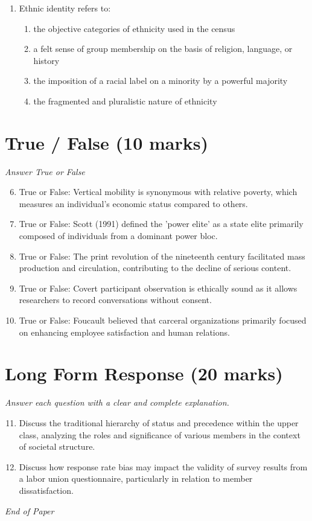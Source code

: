 \documentclass[12pt]{article}
\begin{document}
\begin{enumerate}[label=\arabic*.]
\begin{enumerate}[label=(\alph*)]
    \item creating 'reverse flows' of their own programmes back to imperial societies
    \item all of the above
\end{enumerate}
\item Ethnic identity refers to:
\begin{enumerate}[label=(\alph*)]
    \item the objective categories of ethnicity used in the census
    \item a felt sense of group membership on the basis of religion, language, or history
    \item the imposition of a racial label on a minority by a powerful majority
    \item the fragmented and pluralistic nature of ethnicity
\end{enumerate}
\end{enumerate}

\section*{True / False (10 marks)}
\textit{Answer True or False}
\begin{enumerate}[label=\arabic*.]
\setcounter{enumi}{5}
\item True or False: Vertical mobility is synonymous with relative poverty, which measures an individual's economic status compared to others.
\item True or False: Scott (1991) defined the 'power elite' as a state elite primarily composed of individuals from a dominant power bloc.
\item True or False: The print revolution of the nineteenth century facilitated mass production and circulation, contributing to the decline of serious content.
\item True or False: Covert participant observation is ethically sound as it allows researchers to record conversations without consent.
\item True or False: Foucault believed that carceral organizations primarily focused on enhancing employee satisfaction and human relations.
\end{enumerate}

\section*{Long Form Response (20 marks)}
\textit{Answer each question with a clear and complete explanation.}
\begin{enumerate}[label=\arabic*.]
\setcounter{enumi}{10}
\item Discuss the traditional hierarchy of status and precedence within the upper class, analyzing the roles and significance of various members in the context of societal structure.
\item Discuss how response rate bias may impact the validity of survey results from a labor union questionnaire, particularly in relation to member dissatisfaction.
\end{enumerate}

\vfill
\noindent\textit{End of Paper}
\end{document}
